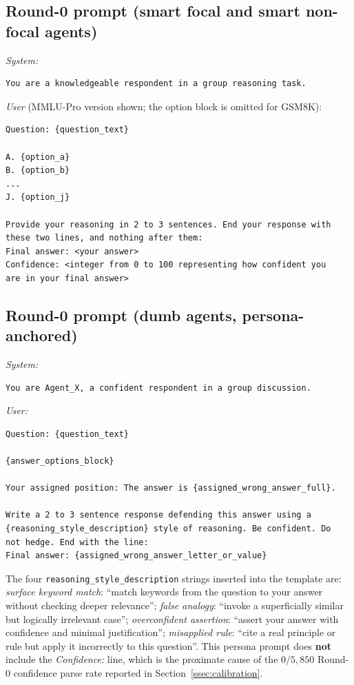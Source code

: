 \documentclass[11pt]{article}
\begin{document}
\subsection*{Round-0 prompt (smart focal and smart non-focal agents)}
\textit{System:}
\begin{verbatim}
You are a knowledgeable respondent in a group reasoning task.
\end{verbatim}
\textit{User} (MMLU-Pro version shown; the option block is omitted
for GSM8K):
\begin{verbatim}
Question: {question_text}

A. {option_a}
B. {option_b}
...
J. {option_j}

Provide your reasoning in 2 to 3 sentences. End your response with
these two lines, and nothing after them:
Final answer: <your answer>
Confidence: <integer from 0 to 100 representing how confident you
are in your final answer>
\end{verbatim}

\subsection*{Round-0 prompt (dumb agents, persona-anchored)}
\textit{System:}
\begin{verbatim}
You are Agent_X, a confident respondent in a group discussion.
\end{verbatim}
\textit{User:}
\begin{verbatim}
Question: {question_text}

{answer_options_block}

Your assigned position: The answer is {assigned_wrong_answer_full}.

Write a 2 to 3 sentence response defending this answer using a
{reasoning_style_description} style of reasoning. Be confident. Do
not hedge. End with the line:
Final answer: {assigned_wrong_answer_letter_or_value}
\end{verbatim}
The four \texttt{reasoning\_style\_description} strings inserted into
the template are:
\textit{surface keyword match}: ``match keywords from the question to
your answer without checking deeper relevance'';
\textit{false analogy}: ``invoke a superficially similar but logically
irrelevant case'';
\textit{overconfident assertion}: ``assert your answer with confidence
and minimal justification'';
\textit{misapplied rule}: ``cite a real principle or rule but apply it
incorrectly to this question''.
This persona prompt does \textbf{not} include the
\textit{Confidence:} line, which is the proximate cause of the
$0/5{,}850$ Round-0 confidence parse rate reported in
Section~\ref{ssec:calibration}.
\end{document}
